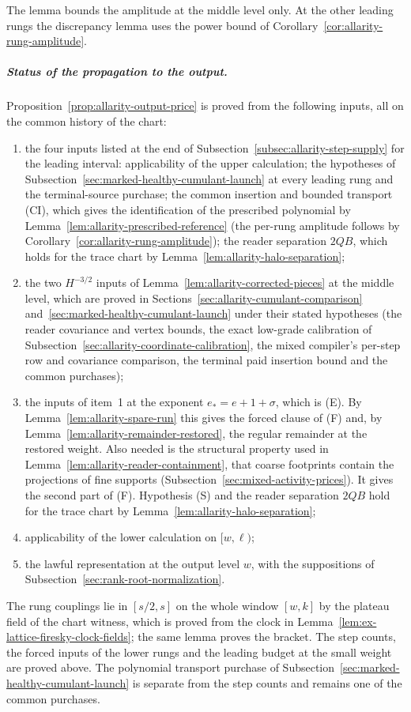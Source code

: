 The lemma bounds the amplitude at the middle level only. At the other
leading rungs the discrepancy lemma uses the power bound of
Corollary~\ref{cor:allarity-rung-amplitude}.

\subparagraph{Status of the propagation to the output.}
Proposition~\ref{prop:allarity-output-price} is proved from the
following inputs, all on the common history of the chart:
\begin{enumerate}
\item the four inputs listed at the end of
 Subsection~\ref{subsec:allarity-step-supply} for the leading interval:
 applicability of the upper calculation; the hypotheses of
 Subsection~\ref{sec:marked-healthy-cumulant-launch} at every leading rung
 and the terminal-source purchase; the common insertion and bounded
 transport (CI), which gives the identification of the prescribed
 polynomial by Lemma~\ref{lem:allarity-prescribed-reference} (the per-rung amplitude
 follows by Corollary~\ref{cor:allarity-rung-amplitude}); the
 reader separation $2QB$, which holds for the trace chart by
 Lemma~\ref{lem:allarity-halo-separation};
\item the two $H^{-3/2}$ inputs of Lemma~\ref{lem:allarity-corrected-pieces}
 at the middle level, which are proved in
 Sections~\ref{sec:allarity-cumulant-comparison}
 and~\ref{sec:marked-healthy-cumulant-launch} under their stated
 hypotheses (the reader covariance and vertex bounds, the exact low-grade
 calibration of Subsection~\ref{sec:allarity-coordinate-calibration}, the
 mixed compiler's per-step row and covariance comparison, the terminal
 paid insertion bound and the common purchases);
\item the inputs of item~1 at the exponent $e_*=e+1+\sigma$, which is (E).
 By Lemma~\ref{lem:allarity-spare-run} this gives the forced clause of (F)
 and, by Lemma~\ref{lem:allarity-remainder-restored}, the regular
 remainder at the restored weight. Also needed is the structural property used in
 Lemma~\ref{lem:allarity-reader-containment}, that coarse footprints
 contain the projections of fine supports
 (Subsection~\ref{sec:mixed-activity-prices}). It gives the second part of
 (F). Hypothesis (S) and the
 reader separation $2QB$ hold for the trace chart by
 Lemma~\ref{lem:allarity-halo-separation};
\item applicability of the lower calculation on $[w,\ell)$;
\item the lawful representation at the output level $w$, with the
 suppositions of Subsection~\ref{sec:rank-root-normalization}.
\end{enumerate}
The rung couplings lie in $[s/2,s]$ on the whole window $[w,k]$ by the
plateau field of the chart witness, which is proved from the clock in
Lemma~\ref{lem:ex-lattice-firesky-clock-fields}; the same lemma proves the
bracket. The step counts, the forced inputs of the lower rungs and the
leading budget at the small weight are proved above. The polynomial
transport purchase of Subsection~\ref{sec:marked-healthy-cumulant-launch} is
separate from the step counts and remains one of the common purchases.

